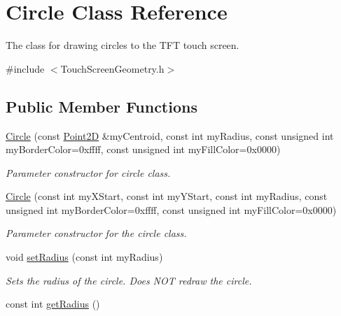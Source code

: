 \hypertarget{class_circle}{\section{Circle Class Reference}
\label{class_circle}
}


The class for drawing circles to the T\+F\+T touch screen.  




{\ttfamily \#include $<$Touch\+Screen\+Geometry.\+h$>$}

\subsection*{Public Member Functions}
\begin{DoxyCompactItemize}
\item 
\hyperlink{class_circle_a88890d82b0634ae7c1f7395d0586d2bd}{Circle} (const \hyperlink{class_point2_d}{Point2\+D} \&my\+Centroid, const int my\+Radius, const unsigned int my\+Border\+Color=0xffff, const unsigned int my\+Fill\+Color=0x0000)
\begin{DoxyCompactList}\small\item\em Parameter constructor for circle class. \end{DoxyCompactList}\item 
\hyperlink{class_circle_ab7a7dd06732d8519b3a2b14266952858}{Circle} (const int my\+X\+Start, const int my\+Y\+Start, const int my\+Radius, const unsigned int my\+Border\+Color=0xffff, const unsigned int my\+Fill\+Color=0x0000)
\begin{DoxyCompactList}\small\item\em Parameter constructor for the circle class. \end{DoxyCompactList}\item 
void \hyperlink{class_circle_a2f81a4869baba24481a710bbd266c395}{set\+Radius} (const int my\+Radius)
\begin{DoxyCompactList}\small\item\em Sets the radius of the circle. Does N\+O\+T redraw the circle. \end{DoxyCompactList}\item 
\hypertarget{class_circle_a4fee50b67efc5b5e188e92379140bb42}{const int \hyperlink{class_circle_a4fee50b67efc5b5e188e92379140bb42}{get\+Radius} ()}\label{class_circle_a4fee50b67efc5b5e188e92379140bb42}


\end{DoxyCompactItemize}
